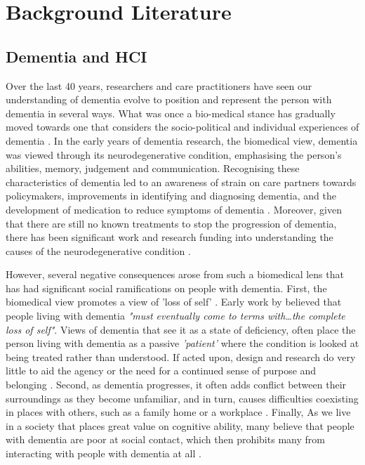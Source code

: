 \chapter{Background Literature}
\label{BackgroundLit}


\section{Dementia and HCI}
\label{BL:DementiaHCI}
Over the last 40 years, researchers and care practitioners have seen our understanding of dementia evolve to position and represent the person with dementia in several ways. What was once a bio-medical stance has gradually moved towards one that considers the socio-political and individual experiences of dementia \citep{bellass_broadening_2019} . In the early years of dementia research, the biomedical view, dementia was viewed through its neurodegenerative condition, emphasising the person's abilities, memory, judgement and communication. Recognising these characteristics of dementia led to an awareness of strain on care partners towards policymakers, improvements in identifying and diagnosing dementia, and the development of medication to reduce symptoms of dementia \citep{doi:10.1080/13607863.2019.1693968}. Moreover, given that there are still no known treatments to stop the progression of dementia, there has been significant work and research funding into understanding the causes of the neurodegenerative condition \citep{bature_signs_2017}.

However, several negative consequences arose from such a biomedical lens that has had significant social ramifications on people with dementia. First, the biomedical view promotes a view of 'loss of self' \citep{ryan_dementia_2009}. Early work by \cite{cohen_loss_1986} believed that people living with dementia \textit{"must eventually come to terms with…the complete loss of self"}. Views of dementia that see it as a state of deficiency, often place the person living with dementia as a passive \textit{'patient'} where the condition is looked at being treated rather than understood. If acted upon, design and research do very little to aid the agency or the need for a continued sense of purpose and belonging \citep{hampson_dementia:_2016}. Second, as dementia progresses, it often adds conflict between their surroundings as they become unfamiliar, and in turn, causes difficulties coexisting in places with others, such as a family home or a workplace \citep{langdon_making_2007}. Finally, As we live in a society that places great value on cognitive ability, many believe that people with dementia are poor at social contact, which then prohibits many from interacting with people with dementia at all \citep{killick_communication_2001}.

